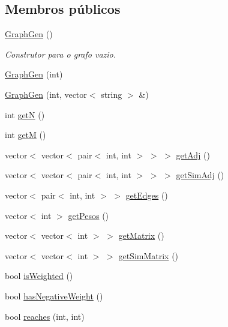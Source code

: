 \subsection*{Membros públicos}
\begin{DoxyCompactItemize}
\item 
\mbox{\label{classGraphGen_a71eb825043c2518df1be9a0ccef36bcb}} 
\hyperlink{classGraphGen_a71eb825043c2518df1be9a0ccef36bcb}{Graph\+Gen} ()
\begin{DoxyCompactList}\small\item\em Construtor para o grafo vazio. \end{DoxyCompactList}\item 
\hyperlink{classGraphGen_aec08708894158ba3098873e7a1da6b60}{Graph\+Gen} (int)
\item 
\hyperlink{classGraphGen_abdb70c362c414ff5a18ab3796126a1a9}{Graph\+Gen} (int, vector$<$ string $>$ \&)
\item 
int \hyperlink{classGraphGen_a7447dc2fdc4cd3f86579811febfff1ad}{getN} ()
\item 
int \hyperlink{classGraphGen_aad12bcf774a0fa97150b01126d3a3e90}{getM} ()
\item 
vector$<$ vector$<$ pair$<$ int, int $>$ $>$ $>$ \hyperlink{classGraphGen_a36741424a266249c915f29fbab96175c}{get\+Adj} ()
\item 
vector$<$ vector$<$ pair$<$ int, int $>$ $>$ $>$ \hyperlink{classGraphGen_ab37943d4526c45711622796c84e983ac}{get\+Sim\+Adj} ()
\item 
vector$<$ pair$<$ int, int $>$ $>$ \hyperlink{classGraphGen_af140b74e5bbb7171a0b76f73d10c14ae}{get\+Edges} ()
\item 
vector$<$ int $>$ \hyperlink{classGraphGen_a56cb589bfd48135fe224d172dbed3155}{get\+Pesos} ()
\item 
vector$<$ vector$<$ int $>$ $>$ \hyperlink{classGraphGen_a32029b7e5e2c379bdc5412f0e954e121}{get\+Matrix} ()
\item 
vector$<$ vector$<$ int $>$ $>$ \hyperlink{classGraphGen_ab2f8872fc9fab4268ad999dd89e1d4fa}{get\+Sim\+Matrix} ()
\item 
bool \hyperlink{classGraphGen_aa0069b56cfa3e2d7d596bda9ba4ccc2b}{is\+Weighted} ()
\item 
bool \hyperlink{classGraphGen_a904cd0ab02e4c837ebd85226996fb4b2}{has\+Negative\+Weight} ()
\item 
bool \hyperlink{classGraphGen_a4fba74f3a12a3153843f550569981b0b}{reaches} (int, int)
\item 

\end{DoxyCompactItemize}
